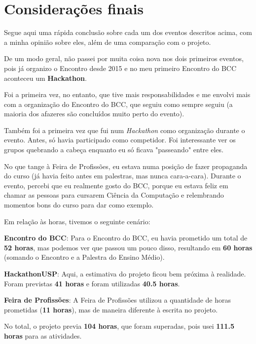 \documentclass[12pt,letterpaper]{article}
\begin{document}
	\section*{Considerações finais}
	Segue aqui uma rápida conclusão sobre cada um dos eventos descritos acima, com a minha opinião sobre eles, além de uma comparação com o projeto.
	
	De um modo geral, não passei por muita coisa nova nos dois primeiros eventos, pois já organizo o Encontro desde 2015 e no meu primeiro Encontro do BCC aconteceu um \textbf{Hackathon}.
	
	Foi a primeira vez, no entanto, que tive mais responsabilidades e me envolvi mais com a organização do Encontro do BCC, que seguiu como sempre seguiu (a maioria dos afazeres são concluídos muito perto do evento).
	
	Também foi a primeira vez que fui num \textit{Hackathon} como organização durante o evento. Antes, só havia participado como competidor. Foi interessante ver os grupos quebrando a cabeça enquanto eu só ficava "passeando" entre eles.
	
	No que tange à Feira de Profissões, eu estava numa posição de fazer propaganda do curso (já havia feito antes em palestras, mas nunca cara-a-cara). Durante o evento, percebi que eu realmente gosto do BCC, porque eu estava feliz em chamar as pessoas para cursarem Ciência da Computação e relembrando momentos bons do curso para dar como exemplo.
	
	Em relação às horas, tivemos o seguinte cenário:
	
	\textbf{Encontro do BCC}: Para o Encontro do BCC, eu havia prometido um total de \textbf{52 horas}, mas podemos ver que passou um pouco disso, resultando em \textbf{60 horas} (somando o Encontro e a Palestra do Ensino Médio).
	
	\textbf{HackathonUSP}:	Aqui, a estimativa do projeto ficou bem próxima à realidade. Foram previstas \textbf{41 horas} e foram utilizadas \textbf{40.5 horas}.
	
	\textbf{Feira de Profissões}: A Feira de Profissões utilizou a quantidade de horas prometidas (\textbf{11 horas}), mas de maneira diferente à escrita no projeto.
	
	No total, o projeto previa \textbf{104 horas}, que foram superadas, pois usei \textbf{111.5 horas} para as atividades.
	
	
	
\end{document}
